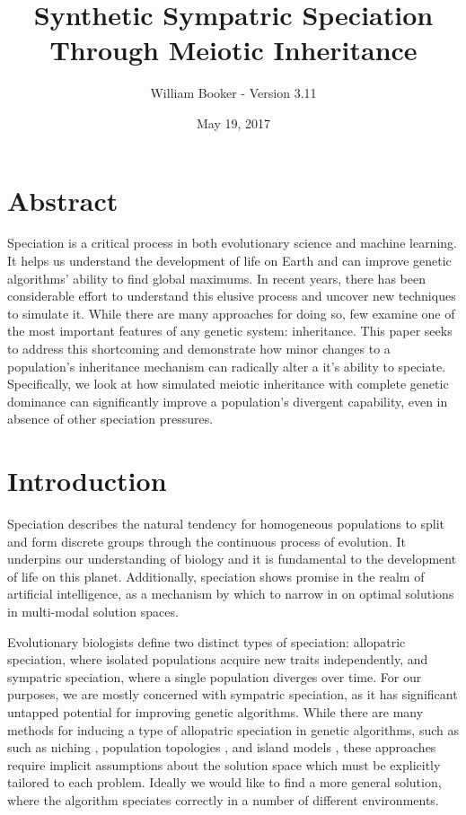 \documentclass{article}
\title{Synthetic Sympatric Speciation Through Meiotic Inheritance}
\author{William Booker - Version 3.11}
\date{May 19, 2017}
\newcommand\TODO[1]{\textcolor{red}{#1}}
\begin{document}
\captionsetup{justification=centering}

\maketitle


\section{Abstract}

Speciation is a critical process in both evolutionary science and machine learning. It helps us understand the development of life on Earth and can improve genetic algorithms' ability to find global maximums. In recent years, there has been considerable effort to understand this elusive process and uncover new techniques to simulate it. While there are many approaches for doing so, few examine one of the most important features of any genetic system: inheritance. This paper seeks to address this shortcoming and demonstrate how minor changes to a population's inheritance mechanism can radically alter a it's ability to speciate. Specifically, we look at how simulated meiotic inheritance with complete genetic dominance can significantly improve a population's divergent capability, even in absence of other speciation pressures. 



\section{Introduction}

Speciation describes the natural tendency for homogeneous populations to split and form discrete groups through the continuous process of evolution. \cite{SPBOOK} It underpins our understanding of biology and it is fundamental to the development of life on this planet. Additionally, speciation shows promise in the realm of artificial intelligence, as a mechanism by which to narrow in on optimal solutions in multi-modal solution spaces.

Evolutionary biologists define two distinct types of speciation: allopatric speciation, where isolated populations acquire new traits independently, and sympatric speciation, where a single population diverges over time. For our purposes, we are mostly concerned with sympatric speciation, as it has significant untapped potential for improving genetic algorithms. While there are many methods for inducing a type of allopatric speciation in genetic algorithms, such as such as niching \cite{NICHING}, population topologies \cite{TOPOLOGIES}, and island models \cite{ISLAND}, these approaches require implicit assumptions about the solution space which must be explicitly tailored to each problem. Ideally we would like to find a more general solution, where the algorithm speciates correctly in a number of different environments. 
\end{document}
